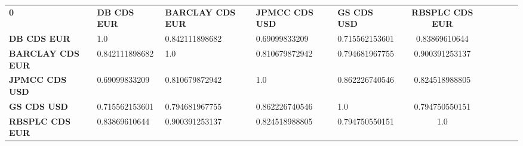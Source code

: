 \begin{center}
 \begin{tabular}{|l|l|l|l|l|c|c|c|c|c|}
\hline
\textbf{0} & \textbf{DB CDS EUR} & \textbf{BARCLAY CDS EUR} & \textbf{JPMCC CDS USD} & \textbf{GS CDS USD} & \textbf{RBSPLC CDS EUR}\\\hhline{|=|=|=|=|=|=|}
\textbf{DB CDS EUR} & 1.0 & 0.842111898682 & 0.69099833209 & 0.715562153601 & 0.83869610644\\
\textbf{BARCLAY CDS EUR} & 0.842111898682 & 1.0 & 0.810679872942 & 0.794681967755 & 0.900391253137\\
\textbf{JPMCC CDS USD} & 0.69099833209 & 0.810679872942 & 1.0 & 0.862226740546 & 0.824518988805\\
\textbf{GS CDS USD} & 0.715562153601 & 0.794681967755 & 0.862226740546 & 1.0 & 0.794750550151\\
\textbf{RBSPLC CDS EUR} & 0.83869610644 & 0.900391253137 & 0.824518988805 & 0.794750550151 & 1.0\\
\hline
\end{tabular}
\end{center}
